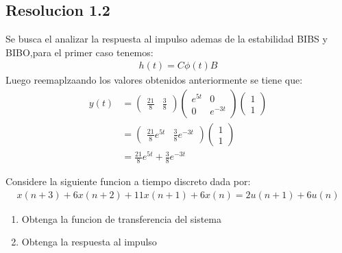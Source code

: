 \documentclass[
  11pt,
  letterpaper,
   addpoints,
   answers
  ]{exam}
\begin{document}
\begin{questions}
\begin{solution}
    \subsection*{Resolucion 1.2}
    Se busca el analizar la respuesta al impulso ademas de la estabilidad BIBS y BIBO,para el primer caso tenemos:
    \begin{align}
        h(t)=C\phi(t)B
    \end{align}
    Luego reemaplzaando los valores obtenidos anteriormente se tiene que:
    \begin{align}
        y(t) &= \begin{pmatrix} \frac{21}{8} & \frac{3}{8} \end{pmatrix} 
        \begin{pmatrix} e^{5t} & 0 \\ 0 & e^{-3t} \end{pmatrix}
        \begin{pmatrix} 1 \\ 1 \end{pmatrix} \\
        &= \begin{pmatrix} \frac{21}{8} e^{5t} & \frac{3}{8} e^{-3t} \end{pmatrix} 
        \begin{pmatrix} 1 \\ 1 \end{pmatrix} \\
        &= \frac{21}{8} e^{5t} + \frac{3}{8} e^{-3t}
        \end{align}
\end{solution}
    \question Considere la siguiente funcion a tiempo discreto dada por:
    \begin{align}
        x(n+3) + 6x(n+2) + 11x(n+1) + 6x(n) = 2u(n+1) + 6u(n) 
    \end{align}
    \begin{enumerate}
        \item Obtenga la funcion de transferencia del sistema 
        \item Obtenga la respuesta al impulso 
    \end{enumerate}
    \begin{solution}

\end{solution}
\end{questions}
\end{document}
